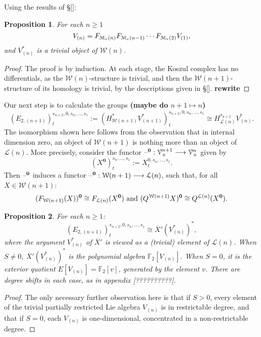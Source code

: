 \documentclass[11pt]{amsart}
\theoremstyle{plain}
\newtheorem{thm}{Theorem}[section]
\newtheorem{prop}[thm]{Proposition}
\theoremstyle{definition}
\newcommand{\DASH}{\textup{--}}
\renewcommand{\to}{\longrightarrow}
\newcommand{\calW}{\mathcal{W}}
\newcommand{\calL}{\mathcal{L}}
\newcommand{\calV}{\mathcal{V}}
\newcommand{\calM}{\mathcal{M}}
\theoremstyle{plain}
\newcommand{\vect}[2]{\calV^{#1}_{#2}}
\newcommand{\UEAX}{\overline{X}'}%
\newcommand{\F}{\mathbb{F}}
\begin{document}
\begin{Calculations of HWn for n nonzero}
 Using the results of \S[]:%
\begin{prop}
For each $n\geq1$
\[V_{(n)}=F_{\calM_\textup{v}(n)}F_{\calM_\textup{v}(n-1)}\cdots F_{\calM_\textup{v}(2)}V_{(1)},\]
and $V_{(n)}^*$ is a trivial object of $\calW(n)$.
\end{prop}
\begin{proof}
The proof is by induction. At each stage, the Koszul complex has no differentials, as the $\calW(n)$-structure is trivial, and then the $\calW(n+1)$-structure of its homology is trivial, by the descriptions given in \S[]. \textbf{rewrite}
\end{proof}
Our next step is to calculate the groups \textbf{(maybe do $n+1\mapsto n$)}
\[(E_{2,(n+1)})^{s_{n+2},0,s_n,\ldots,s_1}_{t}:=(H^*_{\calW(n+1)}V^*_{(n+1)})^{s_{n+2},0,s_n,\ldots,s_1}_{t}\cong H^{s_{n+2}}_{\calL(n)}V_{(n)}^*.\]
The isomorphism shown here follows from the observation that in internal dimension zero, an object of $\calW(n+1)$ is nothing more than an object of $\calL(n)$. More precisely, consider the functor $\DASH^\textbf{0}:\vect{n+1}{+}\to \vect{n}{+}$ given by
\[(X^\textbf{0})_t^{s_n,\ldots,s_1}:=X_t^{0,s_n,\ldots,s_1}.\]
Then $\DASH^\textbf{0}$ induces a functor $\DASH^\textbf{0}:\calW(n+1)\to \calL(n)$, such that, for all $X\in\calW(n+1)$:
\[(F_{\calW(n+1)}(X))^\textbf{0}\cong F_{\calL(n)}(X^\textbf{0})\textup{ and }(Q^{\calW(n+1)}X)^\textbf{0}\cong Q^{\calL(n)}(X^\textbf{0}).\]
\begin{prop}\label{calculation in internal dimension zero}
For each $n\geq1$:
\[(E_{2,(n+1)})^{s_{n+2},0,s_n,\ldots,s_1}_{t}\cong\UEAX(V_{(n)}^*)^*,\]
where the argument $V_{(n)}^*$ of $\UEAX$ is viewed as a (trivial) element of $\calL(n)$. When $S\neq0$, $\UEAX(V_{(n)}^*)^*$ is the polynomial algebra $\F_2[V_{(n)}]$. When $S=0$, it is the exterior quotient $E[V_{(n)}]=\F_2[v]$, generated by the element $v$. There are degree shifts in each case, as in appendix [??????????].  
\end{prop}
\begin{proof}
The only necessary further observation here is that if $S>0$, every element of the trivial partially restricted Lie algebra $V_{(n)}$ is in restrictable degree, and that if $S=0$, each $V_{(n)}$ is one-dimensional, concentrated in a non-restrictable degree.
\end{proof}


\end{Calculations of HWn for n nonzero}
\end{document}
